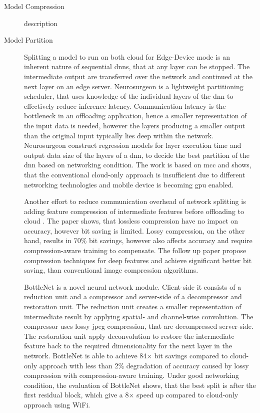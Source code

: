 \begin{description}
	\item[Model Compression] description \cite{courbariaux_binaryconnect:_2015}
	\item[Model Partition] Splitting a model to run on both cloud for Edge-Device mode is an inherent nature of sequential \gls{dnn}s, that at any layer can be stopped. The intermediate output are transferred over the network and continued at the next layer on an edge server. Neurosurgeon \cite{kang_neurosurgeon:_2017} is a lightweight partitioning scheduler, that uses knowledge of the individual layers of the \gls{dnn} to effectively reduce inference latency. Communication latency is the bottleneck in an offloading application, hence a smaller representation of the input data is needed, however the layers producing a smaller output than the original input typically lies deep within the network. Neurosurgeon construct regression models for layer execution time and  output data size of the layers of a \gls{dnn}, to decide the best partition of the \gls{dnn} based on networking condition. The work is based on \gls{mcc} and shows, that the conventional cloud-only approach is insufficient due to different networking technologies and mobile device is becoming \gls{gpu} enabled. 
	
	Another effort to reduce communication overhead of network splitting is adding feature compression of intermediate features before offloading to cloud \cite{choi_deep_2018}. The paper shows, that lossless compression have no impact on accuracy, however bit saving is limited. Lossy compression, on the other hand, results in 70\% bit savings, however also affects accuracy and require compression-aware training to compensate. The follow up paper \cite{choi_near-lossless_2018} propose compression techniques for deep features and achieve significant better bit saving, than conventional image compression algorithms. 
	
	BottleNet \cite{eshratifar_bottlenet:_2019} is a novel neural network module. Client-side it consists of a reduction unit and a compressor and server-side of a decompressor and restoration unit. The reduction unit creates a smaller representation of intermediate result by applying spatial- and channel-wise convolution. The compressor uses lossy \gls{jpeg} compression, that are decompressed server-side. The restoration unit apply deconvolution to restore the intermediate feature back to the required dimensionality for the next layer in the network. BottleNet is able to achieve 84$\times$ bit savings compared to cloud-only approach with less than 2\% degradation of accuracy caused by lossy compression with compression-aware training. Under good networking condition, the evaluation of BottleNet shows, that the best split is after the first residual block, which give a 8$\times$ speed up compared to cloud-only approach using WiFi.
	

\end{description}
